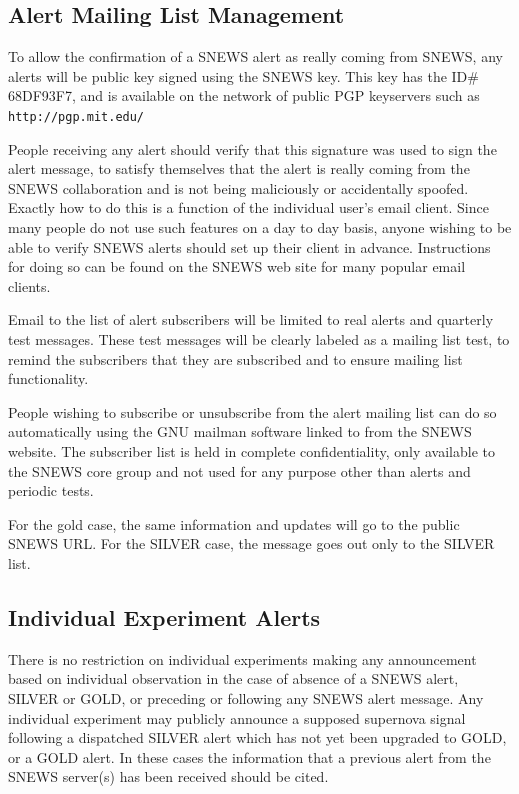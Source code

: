 \documentclass{article}
\begin{document}
\subsection{Alert Mailing List Management}

To allow the confirmation of a SNEWS alert as really coming from SNEWS,
any alerts will be public key signed using the SNEWS key.  This key has
the ID\# 68DF93F7, and is available on the network of public PGP
keyservers such as \texttt{http://pgp.mit.edu/}

People receiving any alert should verify that this signature was used to
sign the alert message, to satisfy themselves that the alert is really
coming from the SNEWS collaboration and is not being maliciously or
accidentally spoofed.  Exactly how to do this is a function of the
individual user's email client.  Since many people do not use such
features on a day to day basis, anyone wishing to be able to verify
SNEWS alerts should set up their client in advance.  Instructions for
doing so can be found on the SNEWS web site for many popular email
clients.  

Email to the list of alert subscribers will be limited to real alerts
and quarterly test messages.  These test messages will be clearly
labeled as a mailing list test, to remind the subscribers that they are
subscribed and to ensure mailing list functionality.

People wishing to subscribe or unsubscribe from the alert mailing list
can do so automatically using the GNU mailman software linked to from
the SNEWS website.  The subscriber list is held in complete
confidentiality, only available to the SNEWS core group and not used for
any purpose other than alerts and periodic tests.


For the gold case, the same information and updates will go
to the public SNEWS URL.
For the SILVER case, the message goes out only to the SILVER list.

\subsection{Individual Experiment Alerts}

There is no restriction on individual experiments making any
announcement based on individual observation in the case of absence of
a SNEWS alert, SILVER or GOLD, or preceding or following any SNEWS
alert message.  Any individual experiment may publicly announce a
supposed supernova signal following a dispatched SILVER alert which
has not yet been upgraded to GOLD, or a GOLD alert.  In these cases
the information that a previous alert from the SNEWS server(s) has
been received should be cited.
\end{document}
